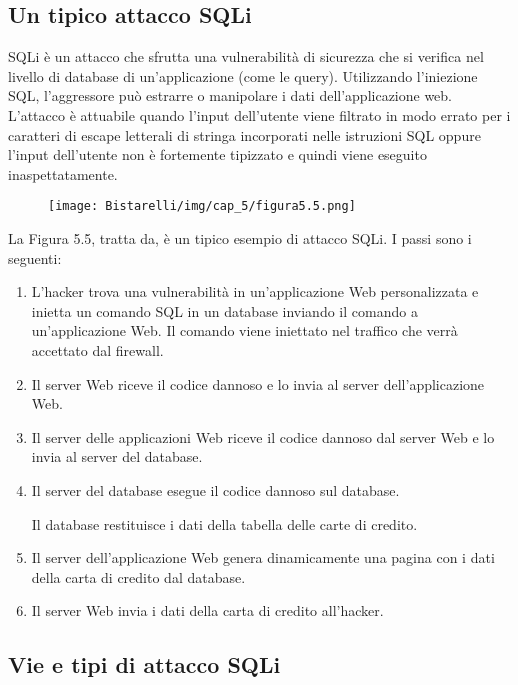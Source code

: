 \subsection{Un tipico attacco SQLi}
SQLi è un attacco che sfrutta una vulnerabilità di sicurezza che si verifica nel livello di database di un'applicazione (come le query). Utilizzando l'iniezione SQL, l'aggressore può estrarre o manipolare i dati dell'applicazione web.
L'attacco è attuabile quando l'input dell'utente viene filtrato in modo errato per i caratteri di escape letterali di stringa incorporati nelle istruzioni SQL oppure l'input dell'utente non è fortemente tipizzato e quindi viene eseguito inaspettatamente.

\begin{figure}[H]
	\centering
    \texttt{[image: Bistarelli/img/cap\_5/figura5.5.png]}
\end{figure}


La Figura 5.5, tratta da, è un tipico esempio di attacco SQLi. I passi sono i seguenti:

\begin{enumerate}
    \item L'hacker trova una vulnerabilità in un'applicazione Web personalizzata e inietta un comando SQL in un database inviando il comando a un'applicazione Web. Il comando viene iniettato nel traffico che verrà accettato dal firewall.
    
    \item Il server Web riceve il codice dannoso e lo invia al server dell'applicazione Web.
    
    \item Il server delle applicazioni Web riceve il codice dannoso dal server Web e lo invia al server del database.
    
    \item  Il server del database esegue il codice dannoso sul database.
    
    Il database restituisce i dati della tabella delle carte di credito.
    
    \item  Il server dell'applicazione Web genera dinamicamente una pagina con i dati della carta di credito dal database.
    
    \item  Il server Web invia i dati della carta di credito all'hacker.
\end{enumerate}

\newpage
\subsection{Vie e tipi di attacco SQLi}

